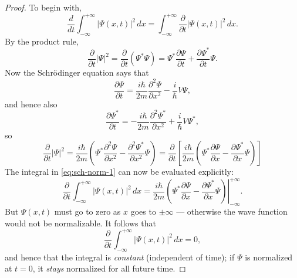 \documentclass{article}
\begin{document}
\begin{proof}
  To begin with, \[
    \frac{d}{dt} \int_{-\infty}^{+\infty} |\Psi(x, t)|^2 \,dx
    = \int_{-\infty}^{+\infty} \frac{\partial}{\partial t} |\Psi(x, t)|^2 \,dx.
  \]
  By the product rule,
  \begin{equation} \label{eq:sch-norm-1}
    \frac{\partial}{\partial t}|\Psi|^2
    = \frac{\partial}{\partial t} (\Psi^* \Psi)
    = \Psi^* \frac{\partial \Psi}{\partial t} +
    \frac{\partial \Psi^*}{\partial t} \Psi.
  \end{equation}
  Now the Schr\"{o}dinger equation says that
  \begin{equation} \label{eq:sch-norm-2}
    \frac{\partial \Psi}{\partial t}
    = \frac{i\hbar}{2m} \frac{\partial^2 \Psi}{\partial x^2} -
    \frac{i}{\hbar} V \Psi,
  \end{equation}
  and hence also
  \begin{equation} \label{eq:sch-norm-3}
    \frac{\partial \Psi^*}{\partial t}
    = -\frac{i\hbar}{2m} \frac{\partial^2 \Psi^*}{\partial x^2} +
    \frac{i}{\hbar} V \Psi^*,
  \end{equation}
  so
  \begin{equation} \label{eq:sch-norm-4}
    \frac{\partial}{\partial t} |\Psi|^2
    = \frac{i\hbar}{2m} \left(
      \Psi^* \frac{\partial^2 \Psi}{\partial x^2} -
      \frac{\partial^2 \Psi^*}{\partial x^2} \Psi
    \right)
    = \frac{\partial}{\partial t} \left[
      \frac{i\hbar}{2m} \left(
        \Psi^* \frac{\partial \Psi}{\partial x} -
        \frac{\partial \Psi^*}{\partial x} \Psi
      \right)
    \right]
  \end{equation}
  The integral in \eqref{eq:sch-norm-1} can now be evaluated explicitly: \[
    \frac{\partial}{\partial t} \int_{-\infty}^{+\infty} |\Psi(x, t)|^2 \,dx
    = \frac{i\hbar}{2m} \left.\left(
      \Psi^* \frac{\partial \Psi}{\partial x} -
      \frac{\partial \Psi^*}{\partial x} \Psi
    \right)\right|_{-\infty}^{+\infty}.
  \] But $\Psi(x, t)$ must go to zero as $x$ goes to $\pm\infty$ --- otherwise
  the wave function would not be normalizable. It follows that
  \begin{equation} \label{eq:sch-norm-5}
    \frac{\partial}{\partial t} \int_{-\infty}^{+\infty} |\Psi(x, t)|^2 \,dx
    = 0,
  \end{equation}
  and hence that the integral is \emph{constant} (independent of time); if
  $\Psi$ is normalized at $t = 0$, it \emph{stays} normalized for all future
  time.
\end{proof}
\end{document}
